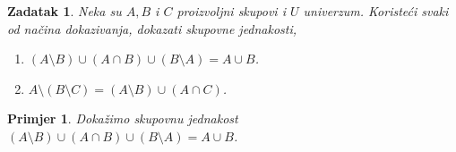 \documentclass{article}
\newtheorem{zadatak}{Zadatak}
\newtheorem{primjer}{Primjer}
\begin{document}

\begin{zadatak}
    Neka su $A, B$ i $C$ proizvoljni skupovi i $U$ univerzum. Koristeći svaki od načina dokazivanja, dokazati skupovne jednakosti,
    \begin{enumerate}
        \item $(A\setminus B)\cup (A\cap B)\cup (B\setminus A)=A\cup B$.
        \item $A\setminus (B\setminus C)=(A\setminus B)\cup (A\cap C)$.
    \end{enumerate}
\end{zadatak}

\vskip 1cm

\begin{primjer}
    Dokažimo skupovnu jednakost $(A\setminus B)\cup (A\cap B)\cup (B\setminus A)=A\cup B$.
\end{primjer}
\end{document}
